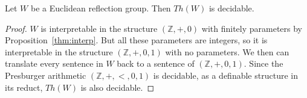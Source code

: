 \documentclass[../main.tex]{subfiles}
\begin{document}
\begin{theorem}
    Let $W$ be a Euclidean reflection group. Then $Th(W)$ is decidable.
\end{theorem}

\begin{proof}
    $W$ is interpretable in the structure $(\mathbb Z, +, 0)$ with finitely parameters by Proposition~\ref{thm:interp}. But all these parameters are integers, so it is interpretable in the structure $(\mathbb Z, +, 0,1)$ with no parameters. We then can translate every sentence in $W$ back to a sentence of $(\mathbb Z, +, 0,1)$. Since the Presburger arithmetic $(\mathbb Z, +, <,0,1)$ is decidable, as a definable structure in its reduct, $Th(W)$ is also decidable.
\end{proof}
\end{document}
